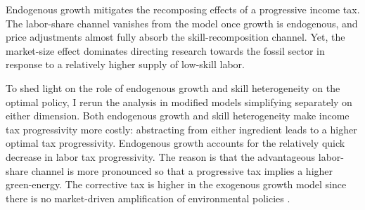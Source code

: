 Endogenous growth mitigates the recomposing effects of a progressive income tax. The labor-share channel vanishes from the model once growth is endogenous, and price adjustments almost fully absorb the skill-recomposition channel. Yet, the market-size effect dominates directing research towards the fossil sector in response to a relatively higher supply of low-skill labor.


 




To shed light on the role of endogenous growth and skill heterogeneity on the optimal policy, I rerun the analysis in modified models simplifying separately on either dimension. 
Both endogenous growth and skill heterogeneity make income tax progressivity more costly: abstracting from either ingredient leads to a higher optimal tax progressivity. 
Endogenous growth accounts for the relatively quick decrease in labor tax progressivity. 
The reason is that the advantageous labor-share channel is more pronounced so that a progressive tax implies a higher green-energy. The corrective tax is higher in the exogenous growth model since there is no market-driven amplification of environmental policies \citep[a finding highlighted in ][]{Fried2018ClimateAnalysis}. 

